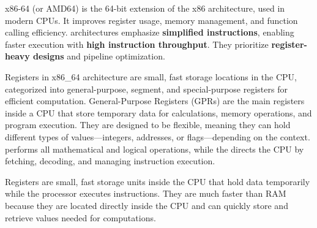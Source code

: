 \begin{NxSSSBox}[breakable][x86-64]
	\begin{NxIDBox}
		x86-64 (or AMD64) is the 64-bit extension of the x86 architecture, used in modern CPUs. It improves register usage, memory management, and function calling efficiency.
		 architectures emphasize \textbf{simplified instructions}, enabling faster execution with \textbf{high instruction throughput}. They prioritize \textbf{register-heavy designs} and pipeline optimization.
	\end{NxIDBox}
	\begin{NxIDBoxL}
		 Registers in x86\_64 architecture are small, fast storage locations in the CPU, categorized into general-purpose, segment, and special-purpose registers for efficient computation.
		 General-Purpose Registers (GPRs) are the main registers inside a CPU that store temporary data for calculations, memory operations, and program execution. They are designed to be flexible, meaning they can hold different types of values—integers, addresses, or flags—depending on the context.
		  performs all mathematical and logical operations, while the  directs the CPU by fetching, decoding, and managing instruction execution. 🚀
	\end{NxIDBoxL}
\end{NxSSSBox}

\begin{NxSSSSBox}
	\begin{NxIDBox}
		Registers are small, fast storage units inside the CPU that hold data temporarily while the processor executes instructions. They are much faster than RAM because they are located directly inside the CPU and can quickly store and retrieve values needed for computations.
	\end{NxIDBox}
\end{NxSSSSBox}

